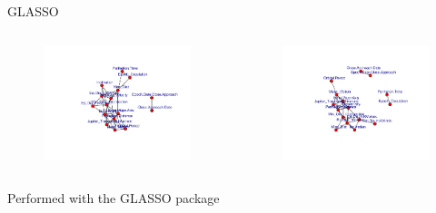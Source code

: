 \documentclass{beamer}
\begin{document}
\begin{frame}{GLASSO}
\begin{columns}
  \begin{figure}[b]{\textwidth}
    \centering
    \includegraphics[width=\textwidth]{Pic/GLASSO_0.1.pdf}
  \end{figure} 
  \begin{figure}[b]{\textwidth}
    \centering
    \includegraphics[width=\textwidth]{Pic/GLASSO_0.2.pdf}
  \end{figure}
\end{columns}
\begin{center}
Performed with the GLASSO package \cite{glasso}
\end{center}
\end{frame}
\end{document}
